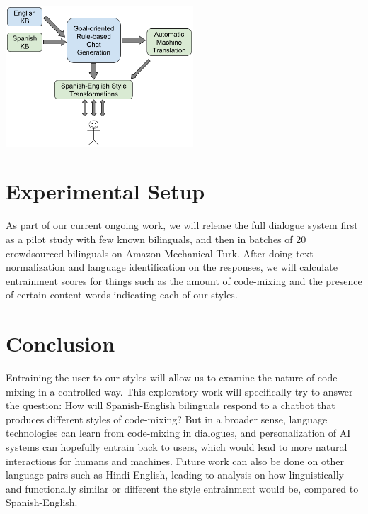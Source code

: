 \documentclass[12pt, letterpaper]{article}
\begin{document}
\begin{multicols*}{2}
\noindent
\begin{center}
\includegraphics[width=7cm]{fig1_0307}
\end{center}


\section{Experimental Setup}

As part of our current ongoing work, we will release the full dialogue system first as a pilot study with few known bilinguals, and then in batches of 20 crowdsourced bilinguals on Amazon Mechanical Turk. After doing text normalization and language identification on the responses, we will calculate entrainment scores for things such as the amount of code-mixing and the presence of certain content words indicating each of our styles.

\section{Conclusion}
Entraining the user to our styles will allow us to examine the nature of code-mixing in a controlled way. This exploratory work will specifically try to answer the question: How will Spanish-English bilinguals respond to a chatbot that produces different styles of code-mixing? But in a broader sense, language technologies can learn from code-mixing in dialogues, and personalization of AI systems can hopefully entrain back to users, which would lead to more natural interactions for humans and machines. Future work can also be done on other language pairs such as Hindi-English, leading to analysis on how linguistically and functionally similar or different the style entrainment would be, compared to Spanish-English.




\end{multicols*}
\end{document}
